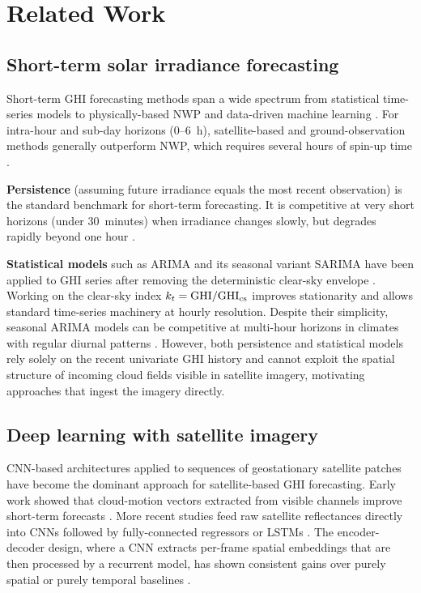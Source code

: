 \section{Related Work}
\label{sec:related}

\subsection{Short-term solar irradiance forecasting}

Short-term GHI forecasting methods span a wide spectrum from statistical time-series
models to physically-based NWP and data-driven machine learning
\cite{diagne2013,voyant2017}. For intra-hour and sub-day horizons (0--6~h),
satellite-based and ground-observation methods generally outperform NWP, which
requires several hours of spin-up time \cite{perez2010}.

\textbf{Persistence} (assuming future irradiance equals the most recent observation)
is the standard benchmark for short-term forecasting. It is competitive at very
short horizons (under 30~minutes) when irradiance changes slowly, but degrades
rapidly beyond one hour \cite{lonij2013}.

\textbf{Statistical models} such as ARIMA and its seasonal variant SARIMA have
been applied to GHI series after removing the deterministic clear-sky envelope
\cite{reikard2009,bacher2009}. Working on the clear-sky index $k_t = \text{GHI}/\text{GHI}_{\text{cs}}$
improves stationarity and allows standard time-series machinery at hourly resolution.
Despite their simplicity, seasonal ARIMA models can be competitive at multi-hour
horizons in climates with regular diurnal patterns \cite{pedro2012}. However,
both persistence and statistical models rely solely on the recent univariate
GHI history and cannot exploit the spatial structure of incoming cloud fields
visible in satellite imagery, motivating approaches that ingest the imagery
directly.

\subsection{Deep learning with satellite imagery}

CNN-based architectures applied to sequences of geostationary satellite patches
have become the dominant approach for satellite-based GHI forecasting. Early
work showed that cloud-motion vectors extracted from visible channels improve
short-term forecasts \cite{chow2011}. More recent studies feed raw satellite
reflectances directly into CNNs followed by fully-connected regressors or LSTMs
\cite{acikgoz2022,paletta2021,feng2022}. The encoder-decoder design, where a CNN
extracts per-frame spatial embeddings that are then processed by a recurrent model,
has shown consistent gains over purely spatial or purely temporal baselines
\cite{wang2019}.

